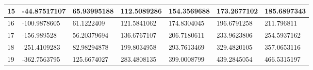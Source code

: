 \documentclass[11pt, letterpaper]{article}
\begin{document}
\begin{appendices}
\begin{table}[!hpt]
\begin{tabular}{|l|l|l|l|l|l|l|}
        15 & -44.87517107 & 65.93995188 & 112.5089286 & 154.3569688 & 173.2677102 & 185.6897343 \\ \hline
        16 & -100.9878605 & 61.1222409 & 121.5841062 & 174.8304045 & 196.6791258 & 211.796811 \\ \hline
        17 & -156.989528 & 56.20379694 & 136.6767107 & 206.7180611 & 233.9623806 & 254.5937162 \\ \hline
        18 & -251.4109283 & 82.98294878 & 199.8034958 & 293.7613469 & 329.4820105 & 357.0653116 \\ \hline
        19 & -362.7563795 & 125.6674027 & 283.4808135 & 399.0008799 & 439.2845054 & 466.5315197 \\ \hline
    \end{tabular}
\end{table}


\end{appendices}
\end{document}
